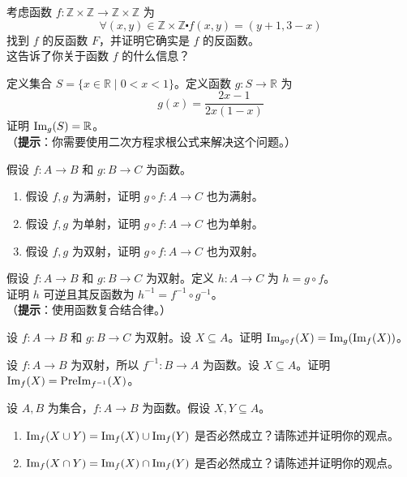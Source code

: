\begin{exercise}
    考虑函数 $f : \mathbb{Z} \times \mathbb{Z} \to \mathbb{Z} \times \mathbb{Z}$ 为
    \[\forall (x, y) \in \mathbb{Z} \times \mathbb{Z} \centerdot f(x, y) = (y + 1, 3 - x)\]
    找到 $f$ 的反函数 $F$，并证明它确实是 $f$ 的反函数。\\
    这告诉了你关于函数 $f$ 的什么信息？
\end{exercise}

\begin{exercise}
    定义集合 $S = \{x \in \mathbb{R} \mid 0 < x < 1\}$。定义函数 $g:S \to \mathbb{R}$ 为
    \[g(x) = \frac{2x-1}{2x(1-x)}\]
    证明 $\text{Im}_g(S) = \mathbb{R}$。\\
    （\textbf{提示}：你需要使用二次方程求根公式来解决这个问题。）
\end{exercise}

\begin{exercise}
    假设 $f : A \to B$ 和 $g : B \to C$ 为函数。
    \begin{enumerate}[label=(\alph*)]
        \item 假设 $f, g$ 为满射，证明 $g \circ f : A \to C$ 也为满射。
        \item 假设 $f, g$ 为单射，证明 $g \circ f : A \to C$ 也为单射。
        \item 假设 $f, g$ 为双射，证明 $g \circ f : A \to C$ 也为双射。
    \end{enumerate} \label{exc:exercises7.8.9}
\end{exercise}

\begin{exercise}
    假设 $f : A \to B$ 和 $g : B \to C$ 为双射。定义 $h : A \to C$ 为 $h = g \circ f$。\\
    证明 $h$ 可逆且其反函数为 $h^{-1} = f^{-1} \circ g^{-1}$。\\
    （\textbf{提示}：使用函数复合结合律。）\label{exc:exercises7.8.10}
\end{exercise} 

\begin{exercise}
    设 $f : A \to B$ 和 $g : B \to C$ 为双射。设 $X \subseteq A$。证明 $\text{Im}_{g \circ f} (X) = \text{Im}_g(\text{Im}_f (X))$。
\end{exercise}

\begin{exercise}
    设 $f : A \to B$ 为双射，所以 $f^{-1} : B \to A$ 为函数。设 $X \subseteq A$。证明 $\text{Im}_f (X) = \text{PreIm}_{f^{-1}} (X)$。
\end{exercise}

\begin{exercise}
    设 $A, B$ 为集合，$f : A \to B$ 为函数。假设 $X,Y \subseteq A$。
    \begin{enumerate}[label=(\alph*)]
        \item $\text{Im}_f (X \cup Y) = \text{Im}_f (X) \cup \text{Im}_f (Y)$ 是否必然成立？请陈述并证明你的观点。
        \item $\text{Im}_f (X \cap Y) = \text{Im}_f (X) \cap \text{Im}_f (Y)$ 是否必然成立？请陈述并证明你的观点。
    \end{enumerate}
\end{exercise}

